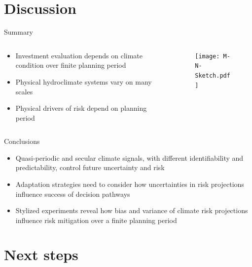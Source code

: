 \documentclass[
  10pt,     %
]{beamer}
\begin{document}
\section{Discussion}

\begin{frame}{Summary}
  \begin{columns}[T]
    \begin{column}{0.45\textwidth}
      \begin{itemize}
        \item Investment evaluation depends on climate condition over finite planning period
        \item Physical hydroclimate systems vary on many scales
        \item Physical drivers of risk depend on planning period
      \end{itemize}    
    \end{column}
    \begin{column}{0.55\textwidth}
      \begin{figure}
        \texttt{[image: M-N-Sketch.pdf]}
      \end{figure}
    \end{column}
  \end{columns}
\end{frame}

\begin{frame}{Conclusions}
  \begin{itemize}
    \item Quasi-periodic and secular climate signals, with different identifiability and predictability, control future uncertainty and risk
    \pause
    \item Adaptation strategies need to consider how uncertainties in risk projections influence success of decision pathways
    \pause
    \item Stylized experiments reveal how bias and variance of climate risk projections influence risk mitigation over a finite planning period
  \end{itemize}
\end{frame}

\section{Next steps}

\end{document}
